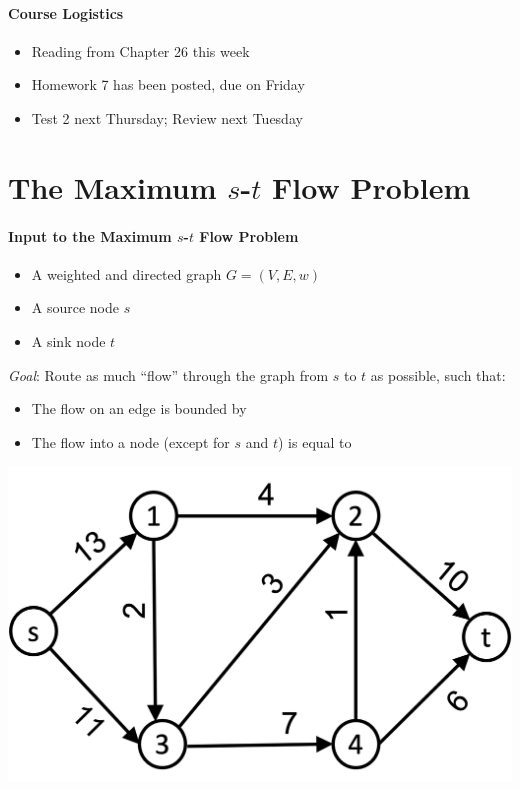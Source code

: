 \documentclass[11  pt]{article}
\begin{document}
	
	
	\paragraph{Course Logistics}
	\begin{itemize}
		\item Reading from Chapter 26 this week
		\item Homework 7 has been posted, due on Friday
		\item Test 2 next Thursday; Review next Tuesday
	\end{itemize}
	
	\section{The Maximum $s$-$t$ Flow Problem}
	
	\paragraph{Input to the Maximum $s$-$t$ Flow Problem}
	\begin{itemize}
		\item A weighted and directed graph $G = (V,E,w)$
		\item A source node $s$
		\item A sink node $t$
	\end{itemize}
	
	\textit{Goal}: Route as much ``flow'' through the graph from $s$ to $t$ as possible, such that:
	\begin{itemize}
		\item The flow on an edge is bounded by 
		\item The flow into a node (except for $s$ and $t$) is equal to 
	\end{itemize}
	
	\begin{center}
		\includegraphics[width = .65\linewidth]{flow1.png} \\
	\end{center}
	
\end{document}
